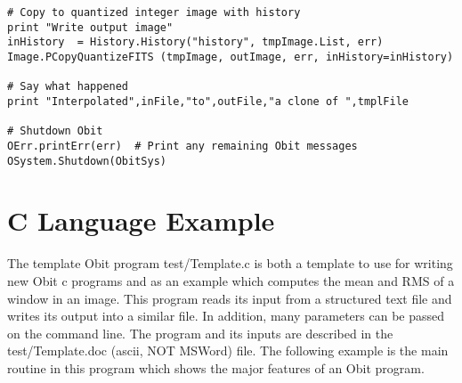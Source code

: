 \documentclass[11pt]{article}
\begin{document}
\begin{verbatim}
# Copy to quantized integer image with history
print "Write output image"
inHistory  = History.History("history", tmpImage.List, err)
Image.PCopyQuantizeFITS (tmpImage, outImage, err, inHistory=inHistory)

# Say what happened
print "Interpolated",inFile,"to",outFile,"a clone of ",tmplFile

# Shutdown Obit
OErr.printErr(err)  # Print any remaining Obit messages
OSystem.Shutdown(ObitSys)
\end{verbatim}

\section {C Language Example}
The template Obit program test/Template.c is both a template to use
for writing new Obit c programs and as an example which computes the
mean and RMS of a window in an image.
This program reads its input from a structured text file and writes
its output into a similar file.
In addition, many parameters can be passed on the command line.
The program and its inputs are described in the test/Template.doc
(ascii, NOT MSWord) file.
The following example is the main routine in this program which shows
the major features of an Obit program.
\end{document}
